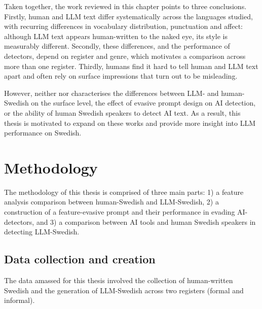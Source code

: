 \documentclass[thesis]{cluu}
\begin{document}
Taken together, the work reviewed in this chapter points to three conclusions. Firstly, human and LLM text differ systematically across the languages studied, with recurring differences in vocabulary distribution, punctuation and affect: although LLM text appears human-written to the naked eye, its style is measurably different. Secondly, these differences, and the performance of detectors, depend on register and genre, which motivates a comparison across more than one register. Thirdly, humans find it hard to tell human and LLM text apart and often rely on surface impressions that turn out to be misleading.

However, neither \textcite{landberg2024aiwolf} nor \textcite{hintze2026aiuse} characterises the differences between LLM- and human-Swedish on the surface level, the effect of evasive prompt design on AI detection, or the ability of human Swedish speakers to detect AI text. As a result, this thesis is motivated to expand on these works and provide more insight into LLM performance on Swedish.
\chapter{Methodology}

The methodology of this thesis is comprised of three main parts: 1) a feature analysis comparison between human-Swedish and LLM-Swedish, 2) a construction of a feature-evasive prompt and their performance in evading AI-detectors, and 3) a comparison between AI tools and human Swedish speakers in detecting LLM-Swedish.

\section{Data collection and creation}

The data amassed for this thesis involved the collection of human-written Swedish and the generation of LLM-Swedish across two registers (formal and informal).
\end{document}
